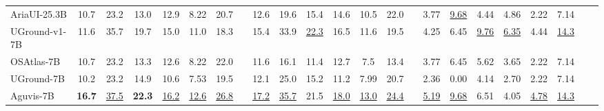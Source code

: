 \begin{table*}[t]
{\begin{tabular}{l *{22}{c}}
         
\rowcolor{open_models_gui_below_8B!50}
{AriaUI-25.3B} \citep{ariaui} 
     & 10.7 
     & 23.2 
     & 13.0 
     & 12.9 
     & 8.22 
     & 20.7 
     & \cellcolor{open_models_gui_below_8B}{12.2} 
     & 12.6 
     & 19.6 
     & 15.4 
     & 14.6 
     & 10.5 
     & 22.0 
     & \cellcolor{open_models_gui_below_8B}{14.0} 
     & 3.77 
     & \underline{9.68} 
     & 4.44 
     & 4.86 
     & 2.22 
     & 7.14 
     & \cellcolor{open_models_gui_below_8B}{3.98} 
     & \cellcolor{open_models_gui_below_8B}{10.1} \\[1ex]

\rowcolor{open_models_gui_below_8B!50}
{UGround-v1-7B} \citep{gou2024uground}  
     & 11.6 
     & 35.7 
     & 19.7 
     & 15.0 
     & 11.0 
     & 18.3 
     & \cellcolor{open_models_gui_below_8B}{15.4} 
     & 15.4 
     & 33.9 
     & \underline{22.3} 
     & 16.5 
     & 11.6 
     & 19.5 
     & \cellcolor{open_models_gui_below_8B}{17.1} 
     & 4.25 
     & 6.45 
     & \underline{9.76} 
     & \underline{6.35} 
     & 4.44 
     & \underline{14.3} 
     & \cellcolor{open_models_gui_below_8B}{\underline{6.25}} 
     & \cellcolor{open_models_gui_below_8B}{12.9} \\[1ex]

\rowcolor{open_models_gui_below_8B!50}
{OSAtlas-7B} \citep{wu2024atlas} 
     & 10.7 
     & 23.2 
     & 13.3 
     & 12.6 
     & 8.22 
     & 22.0 
     & \cellcolor{open_models_gui_below_8B}{12.2} 
     & 11.6 
     & 16.1 
     & 11.4 
     & 12.7 
     & 7.5 
     & 13.4 
     & \cellcolor{open_models_gui_below_8B}{11.2} 
     & 3.77 
     & 6.45 
     & 5.62 
     & 3.65 
     & 2.22 
     & 7.14 
     & \cellcolor{open_models_gui_below_8B}{3.67} 
     & \cellcolor{open_models_gui_below_8B}{9.02} \\[1ex]

\rowcolor{open_models_gui_below_8B!50}
{UGround-7B} \citep{gou2024uground} 
     & 10.2 
     & 23.2 
     & 14.9 
     & 10.6 
     & 7.53 
     & 19.5 
     & \cellcolor{open_models_gui_below_8B}{11.5} 
     & 12.1 
     & 25.0 
     & 15.2 
     & 11.2 
     & 7.99 
     & 20.7 
     & \cellcolor{open_models_gui_below_8B}{12.2} 
     & 2.36 
     & 0.00 
     & 4.14 
     & 2.70 
     & 2.22 
     & 7.14 
     & \cellcolor{open_models_gui_below_8B}{2.79} 
     & \cellcolor{open_models_gui_below_8B}{8.83} \\[1ex]

\rowcolor{open_models_gui_below_8B!50}
{Aguvis-7B} \citep{xu2024aguvisunifiedpurevision} 
     & \textbf{16.7} 
     & \underline{37.5} 
     & \textbf{22.3} 
     & \underline{16.2} 
     & \underline{12.6} 
     & \underline{26.8} 
     & \cellcolor{open_models_gui_below_8B}{\underline{17.8}} 
     & \underline{17.2} 
     & \underline{35.7} 
     & 21.5 
     & \underline{18.0} 
     & \underline{13.0} 
     & \underline{24.4} 
     & \cellcolor{open_models_gui_below_8B}{\underline{18.3}} 
     & \underline{5.19} 
     & \underline{9.68} 
     & 6.51 
     & 4.05 
     & \underline{4.78} 
     & \underline{14.3} 
     & \cellcolor{open_models_gui_below_8B}{5.06} 
     & \cellcolor{open_models_gui_below_8B}{\underline{13.7}} \\[1ex]


\end{tabular}}
\end{table*}
